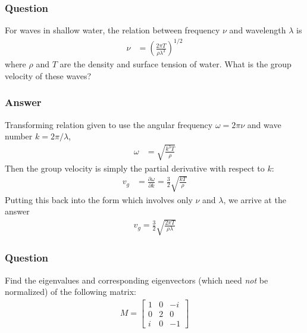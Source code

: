 \subsubsection{Question}

For waves in shallow water, the relation between frequency $\nu $ and wavelength
${\lambda}$ is
\begin{align*}
    \nu  &= (\frac{2{\pi} T}{\rho {\lambda}^3 })^{1/2}
\end{align*}
where $\rho $ and $T$ are the density and surface tension of water. What is the
group velocity of these waves?

\subsubsection{Answer}

Transforming relation given to use the angular frequency ${\omega} = 2{\pi}\nu $ and
wave number $k = 2{\pi}/{\lambda}$,
\begin{align*}
    {\omega} &= \sqrt{ \frac{k^3 T}{\rho } }
\end{align*}
Then the group velocity is simply the partial derivative with respect to $k$:
\begin{align*}
    v_g &= \frac{\partial {\omega}}{\partial k} = \frac 32 \sqrt{\frac{kT}{\rho }}
\end{align*}
Putting this back into the form which involves only $\nu $ and ${\lambda}$, we arrive at
the answer
\begin{align}
    \boxed{ v_g = \frac 32 \sqrt{\frac{2{\pi} T}{\rho {\lambda}}} }
\end{align}

\subsubsection{Question}

Find the eigenvalues and corresponding eigenvectors (which need \emph{not} be
normalized) of the following matrix:
\begin{align*}
    M = \begin{bmatrix}
	1 & 0 & -i \\
	0 & 2 & 0 \\
	i & 0 & -1
    \end{bmatrix}
\end{align*}


